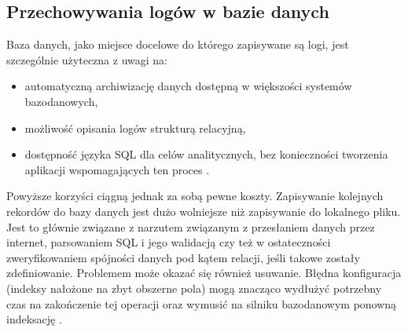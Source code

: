     \subsection{Przechowywania logów w bazie danych}
    \label{chapter:logs:history:db_format}
    Baza danych, jako miejsce docelowe do którego zapisywane są logi, jest szczególnie użyteczna z uwagi na:
    \begin{itemize}
        \item automatyczną archiwizację danych dostępną w większości systemów bazodanowych,
        \item możliwość opisania logów strukturą relacyjną,
        \item dostępność języka SQL dla celów analitycznych, bez konieczności tworzenia aplikacji
        wspomagających ten proces \cite{logging_log_management}.
    \end{itemize}
    Powyższe korzyści ciągną jednak za sobą pewne koszty. Zapisywanie kolejnych rekordów do bazy danych jest 
    dużo wolniejsze niż zapisywanie do lokalnego pliku. Jest to głównie związane z narzutem związanym
    z przesłaniem danych przez internet, parsowaniem SQL i jego walidacją czy też w ostateczności
    zweryfikowaniem spójności danych pod kątem relacji, jeśli takowe zostały zdefiniowanie.
    Problemem może okazać się również usuwanie. Błędna konfiguracja (indeksy nałożone na zbyt obszerne pola) mogą 
    znacząco wydłużyć potrzebny czas na zakończenie tej operacji oraz wymusić na silniku bazodanowym ponowną
    indeksację \cite{logging_log_management}.